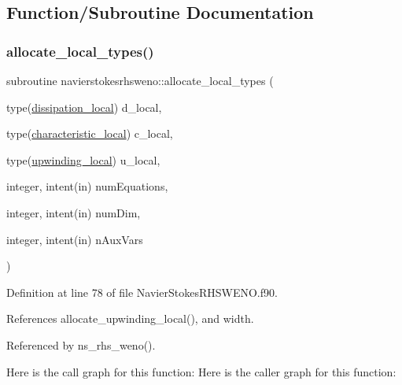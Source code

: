 \subsection{Function/\+Subroutine Documentation}
\hypertarget{namespacenavierstokesrhsweno_a0e801cde0142e2c2046191a109d64601}{}\label{namespacenavierstokesrhsweno_a0e801cde0142e2c2046191a109d64601} 
\subsubsection{\texorpdfstring{allocate\+\_\+local\+\_\+types()}{allocate\_local\_types()}}
{\footnotesize\ttfamily subroutine navierstokesrhsweno\+::allocate\+\_\+local\+\_\+types (\begin{DoxyParamCaption}\item[{type(\hyperlink{structnavierstokesrhsweno_1_1dissipation__local}{dissipation\+\_\+local})}]{d\+\_\+local,  }\item[{type(\hyperlink{structnavierstokesrhsweno_1_1characteristic__local}{characteristic\+\_\+local})}]{c\+\_\+local,  }\item[{type(\hyperlink{structnavierstokesrhsweno_1_1upwinding__local}{upwinding\+\_\+local})}]{u\+\_\+local,  }\item[{integer, intent(in)}]{num\+Equations,  }\item[{integer, intent(in)}]{num\+Dim,  }\item[{integer, intent(in)}]{n\+Aux\+Vars }\end{DoxyParamCaption})}



Definition at line 78 of file Navier\+Stokes\+R\+H\+S\+W\+E\+N\+O.\+f90.



References allocate\+\_\+upwinding\+\_\+local(), and width.



Referenced by ns\+\_\+rhs\+\_\+weno().

Here is the call graph for this function\+:
Here is the caller graph for this function\+:
\hypertarget{namespacenavierstokesrhsweno_abe3d17704e23fdee041cbc4a7c58d78b}{}\label{namespacenavierstokesrhsweno_abe3d17704e23fdee041cbc4a7c58d78b} 
